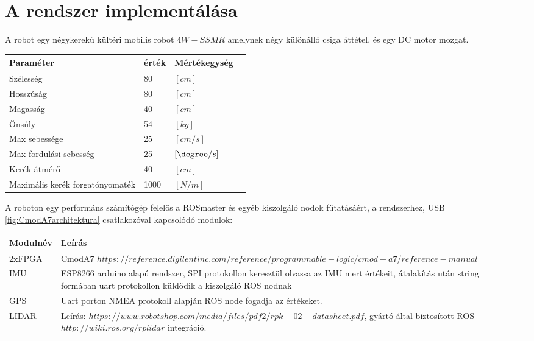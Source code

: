 \chapter{A rendszer implementálása}
A robot egy négykerekű kültéri mobilis robot $4W-SSMR$ amelynek négy különálló csiga áttétel, és egy DC motor mozgat.

\begin{table}[H]
\center
    \begin{tabular}{llll}
        \hline
        Paraméter               & érték     & Mértékegység     \\ \hline
        Szélesség               & 80        &   $[cm]$         \\
        Hosszúság               & 80        &   $[cm]$         \\
        Magasság                & 40        &   $[cm]$         \\
        Önsúly                  & 54        &   $[kg]$         \\
        Max sebessége           & 25        &   $[cm/s]$       \\
        Max fordulási sebesség  &25         &   $[\degree/s]$  \\
        Kerék-átmérő            &40         &   $[cm]$       \\
        Maximális 
        kerék forgatónyomaték   &1000       &   $[N/m]$        \\ 
    \end{tabular}
\end{table}

A roboton egy performáns számítógép felelős a ROSmaster és egyéb kiszolgáló nodok fűtatásáért, a rendszerhez, USB \ref{fig:CmodA7architektura} csatlakozóval kapcsolódó modulok:
\begin{table}[H]
\center
    \begin{tabular}{llll}
        \hline
        Modulnév            & Leírás     \\ \hline
        2xFPGA                          &   \multicolumn{2}{p{12cm}|}{\raggedright CmodA7 $https://reference.digilentinc.com/reference/programmable-logic/cmod-a7/reference-manual$ }      \\
        IMU                       &   \multicolumn{2}{p{12cm}|}{\raggedright ESP8266 arduino alapú rendszer,
        SPI protokollon keresztül olvassa az IMU mert értékeit,
        átalakítás után string formában uart protokollon
        küldődik a kiszolgáló ROS nodnak }       \\
        GPS                     &  \multicolumn{2}{p{12cm}|}{\raggedright Uart porton NMEA protokoll alapján
        ROS node fogadja az értékeket. }        \\
        LIDAR                          & \multicolumn{2}{p{12cm}|}{\raggedright Leírás:
        $https://www.robotshop.com/media/files/pdf2/rpk-02-datasheet.pdf$,
        gyártó által biztosított ROS
        $http://wiki.ros.org/rplidar$
        integráció.     }   \\
       
    \end{tabular}
\end{table}




\newpage


\newpage

